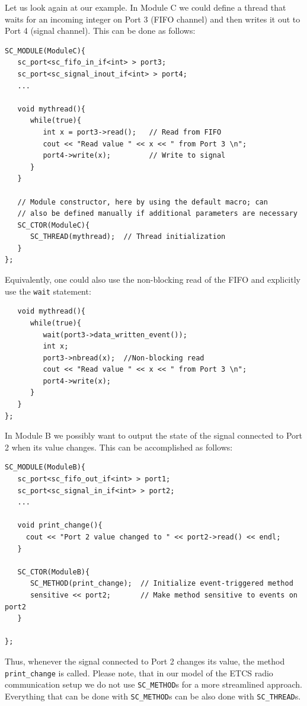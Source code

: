 \documentclass{template/openetcs_article}
\begin{document}
Let us look again at our example. In Module C we could define a thread that waits for an incoming integer on Port 3 (FIFO channel) and then writes it out to Port 4 (signal channel). This can be done as follows:

{\small
\begin{lstlisting}
SC_MODULE(ModuleC){
   sc_port<sc_fifo_in_if<int> > port3;
   sc_port<sc_signal_inout_if<int> > port4;
   ...

   void mythread(){
      while(true){
         int x = port3->read();   // Read from FIFO
         cout << "Read value " << x << " from Port 3 \n";
         port4->write(x);         // Write to signal
      }
   }  

   // Module constructor, here by using the default macro; can
   // also be defined manually if additional parameters are necessary
   SC_CTOR(ModuleC){
      SC_THREAD(mythread);  // Thread initialization
   }
};
\end{lstlisting}
}

Equivalently, one could also use the non-blocking read of the FIFO and explicitly use the \verb|wait| statement:

{\small
\begin{lstlisting}
   void mythread(){
      while(true){
         wait(port3->data_written_event()); 
         int x;
         port3->nbread(x);  //Non-blocking read
         cout << "Read value " << x << " from Port 3 \n";
         port4->write(x);
      }
   }  
};
\end{lstlisting}
}

In Module B we possibly want to output the state of the signal connected to Port 2 when its value changes. This can be accomplished as follows:

{\small
\begin{lstlisting}
SC_MODULE(ModuleB){
   sc_port<sc_fifo_out_if<int> > port1;
   sc_port<sc_signal_in_if<int> > port2;
   ...

   void print_change(){
     cout << "Port 2 value changed to " << port2->read() << endl;
   }

   SC_CTOR(ModuleB){
      SC_METHOD(print_change);  // Initialize event-triggered method
      sensitive << port2;       // Make method sensitive to events on port2
   }

};
\end{lstlisting}
}

Thus, whenever the signal connected to Port 2 changes its value, the method \verb|print_change| is called. Please note, that in our model of the ETCS radio communication setup we do not use \verb|SC_METHOD|s for a more streamlined approach. Everything that can be done with \verb|SC_METHOD|s can be also done with \verb|SC_THREAD|s.
\end{document}
